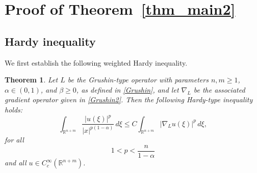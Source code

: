 \documentclass[12pt]{amsart}
\newtheorem{theorem}{Theorem}[section]
\begin{document}
\section{Proof of Theorem~\ref{thm_main2}}

\subsection{Hardy inequality}

We first establish the following weighted Hardy inequality.


\begin{theorem}\label{hardy_x}
Let $L$ be the Grushin-type operator with parameters $n,m\ge 1$, $\alpha \in (0,1)$,
and $\beta \ge 0$, as defined in \eqref{Grushin}, and let $\nabla_L$ be the associated
gradient operator given in \eqref{Grushin2}. Then the following Hardy-type inequality
holds:
\begin{equation}\label{eq_hardy_x}
    \int_{\mathbb R^{n+m}}
    \frac{|u(\xi)|^p}{|x|^{p(1-\alpha)}}\,d\xi
    \leq
    C
    \int_{\mathbb R^{n+m}}
    |\nabla_L u(\xi)|^p \, d\xi,
\end{equation}
for all
\[
    1<p<\frac{n}{1-\alpha}
\]
and all $u\in C_c^\infty(\mathbb R^{n+m})$.
\end{theorem}
\end{document}
